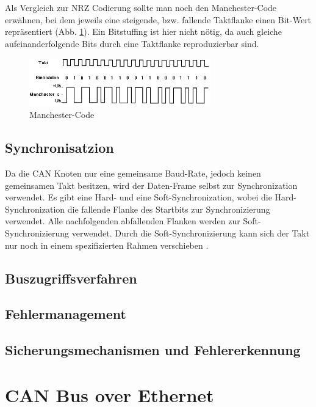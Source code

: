Als Vergleich zur NRZ Codierung sollte man noch den Manchester-Code erwähnen, bei dem
jeweils eine steigende, bzw. fallende Taktflanke einen Bit-Wert repräsentiert (Abb. \ref{mancode}).
Ein Bitstuffing ist hier nicht nötig, da auch gleiche aufeinanderfolgende Bits durch eine Taktflanke 
reproduzierbar sind.

\begin{figure}[h] 
\centering
\includegraphics[width=0.7\textwidth]{figures/mancode}
\caption{Manchester-Code \citep{MAN}} 
\label{mancode}
\end{figure} 
	
\subsection{Synchronisatzion}

Da die CAN Knoten nur eine gemeinsame Baud-Rate, jedoch keinen gemeinsamen Takt besitzen, 
wird der Daten-Frame selbst zur Synchronization verwendet. Es gibt eine Hard- und eine Soft-Synchronization,
wobei die Hard-Synchronization die fallende Flanke des Startbits zur Synchronizierung verwendet. Alle 
nachfolgenden abfallenden Flanken werden zur Soft-Synchronizierung verwendet. Durch die Soft-Synchronizierung
kann sich der Takt nur noch in einem spezifizierten Rahmen verschieben \citep[nach][]{BSY}.
	
\subsection{Buszugriffsverfahren}
	
\subsection{Fehlermanagement}
	
\subsection{Sicherungsmechanismen und Fehlererkennung}
\label{sec:security}

\newpage
\section{CAN Bus over Ethernet}
	
